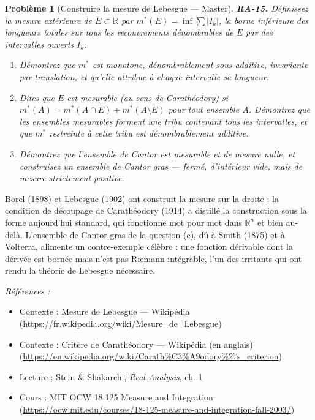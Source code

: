 \documentclass[11pt]{article}
\newtheorem{problem}{Problème}
\newenvironment{refs}{\par\small\noindent\emph{Références :}\begin{itemize}\setlength\itemsep{0pt}}{\end{itemize}\normalsize}
\begin{document}
\bigskip

\begin{problem}[{Construire la mesure de Lebesgue --- Master}]
\textbf{RA-15.} Définissez la mesure extérieure de $ E \subset \mathbb{R} $ par
$ m^*(E) = \inf \sum |I_k| $, la borne inférieure des longueurs totales sur tous les
recouvrements dénombrables de $ E $ par des intervalles ouverts $ I_k $.
\begin{enumerate}
\item[(a)] Démontrez que $ m^* $ est monotone, dénombrablement
sous-additive, invariante par translation, et qu'elle attribue à chaque intervalle sa longueur.
\item[(b)] Dites que $ E $ est
mesurable (au sens de Carathéodory) si $ m^*(A) = m^*(A \cap E) + m^*(A \setminus E) $ pour tout
ensemble $ A $. Démontrez que les ensembles mesurables forment une tribu contenant tous les
intervalles, et que $ m^* $ restreinte à cette tribu est dénombrablement additive.
\item[(c)] Démontrez que l'ensemble de Cantor est mesurable
et de mesure nulle, et construisez un \og{} ensemble de Cantor gras \fg{} --- fermé, d'intérieur vide, mais de
mesure strictement positive.
\end{enumerate}

\end{problem}

\noindent Borel (1898) et Lebesgue (1902) ont construit la mesure sur la droite ; la
condition de découpage de Carathéodory (1914) a distillé la construction sous la forme aujourd'hui
standard, qui fonctionne mot pour mot dans $ \mathbb{R}^n $ et bien au-delà. L'ensemble de Cantor
gras de la question (c), dû à Smith (1875) et à Volterra, alimente un contre-exemple célèbre : une
fonction dérivable dont la dérivée est bornée mais n'est pas Riemann-intégrable, l'un des irritants
qui ont rendu la théorie de Lebesgue nécessaire.

\begin{refs}
\item Contexte : Mesure de Lebesgue --- Wikipédia (\url{https://fr.wikipedia.org/wiki/Mesure_de_Lebesgue})
\item Contexte : Critère de Carathéodory --- Wikipédia (en anglais) (\url{https://en.wikipedia.org/wiki/Carath%C3%A9odory%27s_criterion})
\item Lecture : Stein \& Shakarchi, \textit{Real Analysis}, ch. 1
\item Cours : MIT OCW 18.125 Measure and Integration (\url{https://ocw.mit.edu/courses/18-125-measure-and-integration-fall-2003/})
\end{refs}
\end{document}
